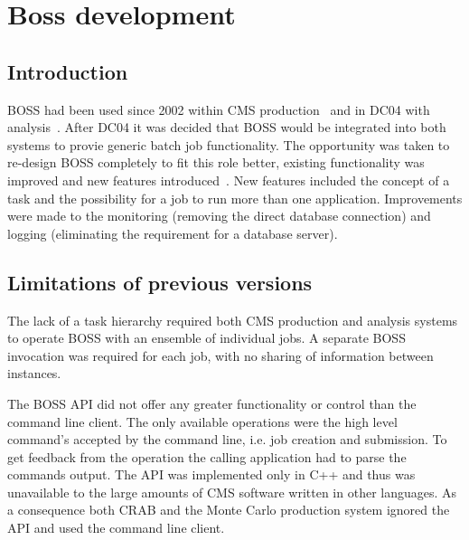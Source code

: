 \chapter{Boss development}
\section{Introduction}
BOSS had been used since 2002 within CMS production~\cite{citeulike:877254} and in DC04 with analysis~\cite{CHEP04_TALLINI, citeulike:876380}. After DC04 it was decided that BOSS would be integrated into both systems to provie generic batch job functionality. The opportunity was taken to re-design BOSS completely to fit this role better, existing functionality was improved and new features introduced~\cite{citeulike:880984}. New features included the concept of a task and the possibility for a job to run more than one application. Improvements were made to the monitoring (removing the direct database connection) and logging (eliminating the requirement for a database server). 

\section{Limitations of previous versions}

The lack of a task hierarchy required both CMS production and analysis systems to operate BOSS with an ensemble of individual jobs. A separate BOSS invocation was required for each job, with no sharing of information between instances.

The BOSS API did not offer any greater functionality or control than the command line client. The only available operations were the high level command's accepted by the command line, i.e. job creation and submission. To get feedback from the operation the calling application had to parse the commands output. The API was implemented only in C++ and thus was unavailable to the large amounts of CMS software written in other languages. As a consequence both CRAB and the Monte Carlo production system ignored the API and used the command line client.

